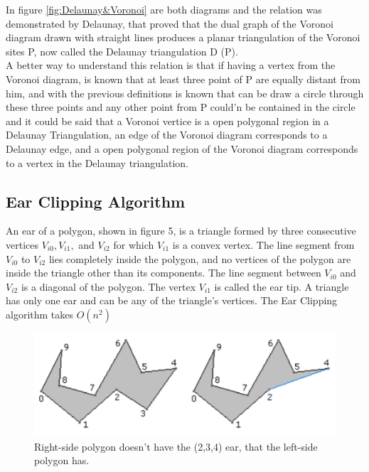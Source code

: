 \documentclass[conference]{IEEEtran}
\begin{document}
In figure \ref{fig:Delaunay&Voronoi} are both diagrams and the relation was demonstrated by Delaunay, that proved that the dual graph of the Voronoi diagram drawn with straight lines produces a planar triangulation of the Voronoi sites P, now called the Delaunay triangulation D (P).\cite{DelaunayTriangulation}\\
A better way to understand this relation is that if having a vertex from the Voronoi diagram, is known that at least three point of P are equally distant from him, and with the previous definitions is known that can be draw a circle through these three points and any other point from P could'n be contained in the circle and it could be said that a Voronoi vertice is a open polygonal region in a Delaunay Triangulation, an edge of the Voronoi diagram corresponds to a Delaunay edge, and a open polygonal region of the Voronoi diagram corresponds to a vertex in the Delaunay triangulation.\cite{TriangulationsUnknown}
    
\subsection{Ear Clipping Algorithm}
An ear of a polygon, shown in figure 5, is a triangle formed by three consecutive vertices $V_{i0},V_{i1},$ and $V_{i2}$ for which $V_{i1}$ is a convex vertex. The line segment from $V_{i0}$ to $V_{i2}$ lies completely inside the polygon, and no vertices of the polygon are inside the triangle other than its components. The line segment between $V_{i0}$ and $V_{i2}$ is a diagonal of the polygon. The vertex $V_{i1}$ is called the ear tip. A triangle has only one ear and can be any of the triangle's vertices. The Ear Clipping algorithm takes $O(n^2)$\cite{EarClipping}
\begin{figure}
    \centering
    \includegraphics[scale=0.5]{triangleEar}
    \caption{Right-side polygon doesn't have the (2,3,4) ear, that the left-side polygon has.}
    \label{fig:earExample}
\end{figure}
\end{document}
